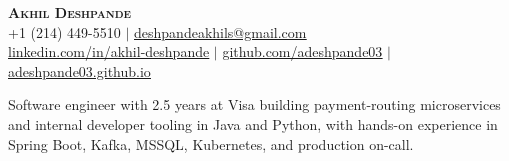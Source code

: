 \documentclass[letterpaper]{article}
\begin{document}
\begin{center}
    \textbf{\Huge \scshape Akhil Deshpande} \\ \vspace{1pt}
    \small +1 (214) 449-5510 $|$ \href{mailto:deshpandeakhils@gmail.com}{\underline{deshpandeakhils@gmail.com}} \\
    \href{https://www.linkedin.com/in/akhil-deshpande/}{\underline{linkedin.com/in/akhil-deshpande}} $|$
    \href{https://github.com/adeshpande03}{\underline{github.com/adeshpande03}} $|$
    \href{https://adeshpande03.github.io}{\underline{adeshpande03.github.io}}
\end{center}

\vspace{-4pt}
{\small Software engineer with 2.5 years at Visa building payment-routing microservices and internal developer tooling in Java and Python, with hands-on experience in Spring Boot, Kafka, MSSQL, Kubernetes, and production on-call.}

\end{document}
